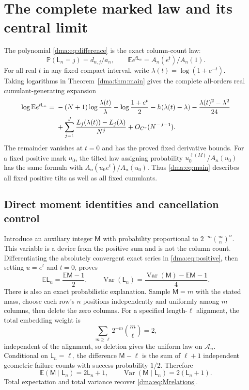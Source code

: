 \documentclass[11pt,letterpaper]{article}
\theoremstyle{remark}\newtheorem{remark}[theorem]{Remark}
\newcommand{\E}{\mathbb E}
\newcommand{\Var}{\operatorname{Var}}
\newcommand{\Prob}{\mathbb P}
\begin{document}
\section{The complete marked law and its central limit}\label{dma:sec:statistics}
The polynomial \eqref{dma:eq:difference} is the exact column-count law:
\[
 \Prob(\mathsf L_n=j)=d_{n,j}/a_n,\qquad
 \E e^{t\mathsf L_n}=A_n(e^t)/A_n(1).
\]
For all real $t$ in any fixed compact interval, write $\lambda(t)=\log(1+e^{-t})$. Taking logarithms in Theorem~\ref{dma:thm:main} gives the complete all-orders real cumulant-generating expansion
\begin{align}\label{dma:eq:cgf}
 \log\E e^{t\mathsf L_n}
 ={}&-(N+1)\log\frac{\lambda(t)}\lambda
 -\log\frac{1+e^t}{2}
 -h(\lambda(t)-\lambda)
 -\frac{\lambda(t)^2-\lambda^2}{24}\notag\\
 &+\sum_{j=1}^J\frac{L_j(\lambda(t))-L_j(\lambda)}{N^j}
 +O_{C^r}(N^{-J-1}).
\end{align}
The remainder vanishes at $t=0$ and has the proved fixed derivative bounds. For a fixed positive mark $u_0$, the tilted law assigning probability $u_0^{\ell(M)}/A_n(u_0)$ has the same formula with $A_n(u_0e^t)/A_n(u_0)$. Thus \eqref{dma:eq:main} describes all fixed positive tilts as well as all fixed cumulants.

\subsection{Direct moment identities and cancellation control}
Introduce an auxiliary integer $\mathsf M$ with probability proportional to $2^{-m}\binom mn^n$. This variable is a device from the positive sum and is not the column count. Differentiating the absolutely convergent exact series in \eqref{dma:eq:positive}, then setting $u=e^t$ and $t=0$, proves
\begin{equation}\label{dma:eq:Mrelations}
 \E\mathsf L_n=\frac{\E\mathsf M-1}{2},\qquad
 \Var(\mathsf L_n)=\frac{\Var(\mathsf M)-\E\mathsf M-1}{4}.
\end{equation}
There is also an exact probabilistic explanation. Sample $\mathsf M=m$ with the stated mass, choose each row's $n$ positions independently and uniformly among $m$ columns, then delete the zero columns. For a specified length-$\ell$ alignment, the total embedding weight is
\[
 \sum_{m\geq\ell}2^{-m}\binom m\ell=2,
\]
independent of the alignment, so deletion gives the uniform law on $\mathcal A_n$. Conditional on $\mathsf L_n=\ell$, the difference $\mathsf M-\ell$ is the sum of $\ell+1$ independent geometric failure counts with success probability $1/2$. Therefore
\[
 \E(\mathsf M\mid\mathsf L_n)=2\mathsf L_n+1,\qquad
 \Var(\mathsf M\mid\mathsf L_n)=2(\mathsf L_n+1).
\]
Total expectation and total variance recover \eqref{dma:eq:Mrelations}.
\end{document}
